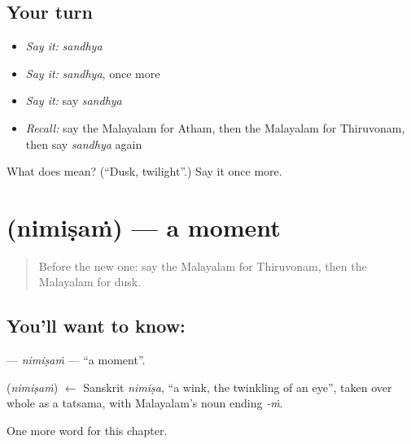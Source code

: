 \subsection*{Your turn}
\begin{itemize}
\raggedright
  \item \emph{Say it:} \emph{sandhya}
  \item \emph{Say it:} \emph{sandhya}, once more
  \item \emph{Say it:} say \emph{sandhya}
  \item \emph{Recall:} say the Malayalam for Atham, then the Malayalam for Thiruvonam, then say \emph{sandhya} again
\end{itemize}

\begin{tcolorbox}[breakable,colback=teal!4,colframe=teal!35!black,title={Before you move on}]
What does  mean? (\textquotedblleft{}Dusk, twilight\textquotedblright{}.) Say it once more.
\end{tcolorbox}
\section[\texorpdfstring{\ml{നിമിഷം} (nimiṣaṁ)}{നിമിഷം (nimiṣaṁ)}]{ (nimiṣaṁ) — a moment}

\label{lesson:ML-C236-nimisam}



\begin{quote}
Before the new one: say the Malayalam for Thiruvonam, then the Malayalam for dusk.
\end{quote}

\subsection*{You'll want to know: }
\textbf{} — \emph{nimiṣaṁ} — \textquotedblleft{}a moment\textquotedblright{}.

\begin{cousinweb}
\textbf{} (\emph{nimiṣaṁ}) $\leftarrow$ Sanskrit \emph{nimiṣa}, \textquotedblleft{}a wink, the twinkling of an eye\textquotedblright{}, taken over whole as a tatsama, with Malayalam's noun ending \emph{-ṁ}.
\end{cousinweb}

\begin{grammarlens}[title={What you've built}]
One more word for this chapter.
\end{grammarlens}

